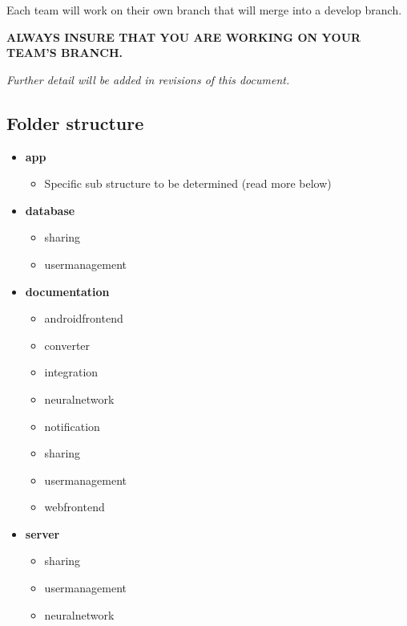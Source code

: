 \documentclass{article}
\begin{document}
\vspace{0.5cm}

Each team will work on their own branch that will merge into a develop branch.

\begin{center}
\textbf{ALWAYS INSURE THAT YOU ARE WORKING ON YOUR TEAM'S BRANCH.}
\end{center}
\newline
\begin{center}
   \textit{Further detail will be added in revisions of this document.}
\end{center}

\newpage
\subsection{Folder structure}
\begin{itemize}
\item \textbf{app}
    \begin{itemize}
    \item Specific sub structure to be determined (read more below)
    \end{itemize}
\item \textbf{database}
    \begin{itemize}
    \item sharing
    \item usermanagement
    \end{itemize}
\item \textbf{documentation}
    \begin{itemize}
    \item androidfrontend
    \item converter
    \item integration
    \item neuralnetwork
    \item notification
    \item sharing
    \item usermanagement
    \item webfrontend
    \end{itemize}
\item \textbf{server}
    \begin{itemize}
    \item sharing
    \item usermanagement
    \item neuralnetwork
    \end{itemize}
\end{itemize}
\end{document}

